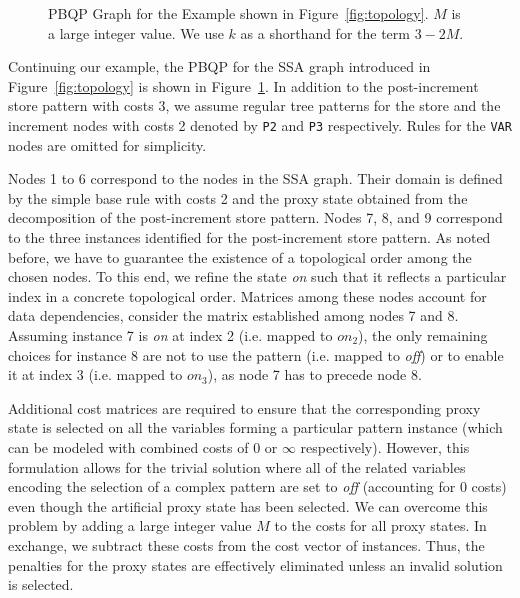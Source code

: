 \begin{figure}
  \caption{PBQP Graph for the Example shown in
    Figure~\ref{fig:topology}. $M$ is a large integer value. We use $k$ as a shorthand for the term
    $3-2M$.}\label{fig:pbqpinst}
\end{figure}

Continuing our example, the PBQP for the SSA graph introduced in
Figure~\ref{fig:topology} is shown in Figure~\ref{fig:pbqpinst}. In
addition to the post-increment store pattern with costs 3, we assume
regular tree patterns for the store and the increment nodes with costs
2 denoted by \texttt{P2} and \texttt{P3} respectively. Rules for the
\texttt{VAR} nodes are omitted for simplicity.

Nodes 1 to 6 correspond to the nodes in the SSA graph. Their
domain is defined by the simple base rule with costs 2 and the proxy
state obtained from the decomposition of the post-increment store
pattern. Nodes 7, 8, and 9 correspond to the three instances
identified for the post-increment store pattern. As noted before, we
have to guarantee the existence of a topological order among the
chosen nodes. To this end, we refine the state \textit{on} such that it
reflects a particular index in a concrete topological order. Matrices
among these nodes account for data dependencies, \eg consider the
matrix established among nodes 7 and 8. Assuming instance 7 is
\textit{on} at index 2 (i.e. mapped to $on_2$), the only remaining choices for instance 8 are
not to use the pattern (i.e. mapped to \textit{off}) or to enable it at index 3 (i.e. mapped to $on_3$), as node 7 has
to precede node 8.

Additional cost matrices are required to ensure that the corresponding
proxy state is selected on all the variables forming a particular
pattern instance (which can be modeled with combined costs of 0 or
$\infty$ respectively). However, this formulation allows for the
trivial solution where all of the related variables encoding the
selection of a complex pattern are set to \textit{off} (accounting for
0 costs) even though the artificial proxy state has been selected. We
can overcome this problem by adding a large integer value $M$ to the
costs for all proxy states. In exchange, we subtract these costs from
the cost vector of instances. Thus, the penalties for the proxy states
are effectively eliminated unless an invalid solution is selected.

